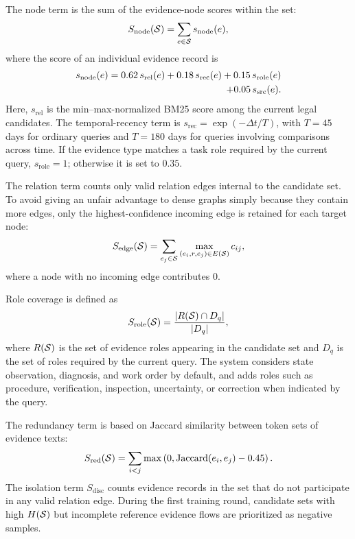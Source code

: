 The node term is the sum of the evidence-node scores within the set:
\begin{equation}
S_{\mathrm{node}}(\mathcal{S})
=
\sum_{e\in\mathcal{S}}s_{\mathrm{node}}(e),
\end{equation}
where the score of an individual evidence record is
\begin{align}
s_{\mathrm{node}}(e)
=
0.62\,s_{\mathrm{rel}}(e)
+0.18\,s_{\mathrm{rec}}(e)
+0.15\,s_{\mathrm{role}}(e) \\
+0.05\,s_{\mathrm{src}}(e). \notag
\end{align}
Here, $s_{\mathrm{rel}}$ is the min--max-normalized BM25 score among the current legal candidates.
The temporal-recency term is $s_{\mathrm{rec}}=\exp(-\Delta t/T)$, with $T=45$ days for ordinary queries and $T=180$ days for queries involving comparisons across time.
If the evidence type matches a task role required by the current query, $s_{\mathrm{role}}=1$; otherwise it is set to $0.35$.

The relation term counts only valid relation edges internal to the candidate set. To avoid giving an unfair advantage to dense graphs simply because they contain more edges, only the highest-confidence incoming edge is retained for each target node:
\begin{equation}
S_{\mathrm{edge}}(\mathcal{S})
=
\sum_{e_j\in\mathcal{S}}
\max_{(e_i,r,e_j)\in E(\mathcal{S})}c_{ij},
\end{equation}
where a node with no incoming edge contributes 0.

Role coverage is defined as
\begin{equation}
S_{\mathrm{role}}(\mathcal{S})
=
\frac{|R(\mathcal{S})\cap D_q|}{|D_q|},
\end{equation}
where $R(\mathcal{S})$ is the set of evidence roles appearing in the candidate set and $D_q$ is the set of roles required by the current query. The system considers state observation, diagnosis, and work order by default, and adds roles such as procedure, verification, inspection, uncertainty, or correction when indicated by the query.

The redundancy term is based on Jaccard similarity between token sets of evidence texts:
\begin{equation}
S_{\mathrm{red}}(\mathcal{S})
=
\sum_{i<j}
\max\left(
0,
\operatorname{Jaccard}(e_i,e_j)-0.45
\right).
\end{equation}
The isolation term $S_{\mathrm{disc}}$ counts evidence records in the set that do not participate in any valid relation edge.
During the first training round, candidate sets with high $H(\mathcal{S})$ but incomplete reference evidence flows are prioritized as negative samples. 


